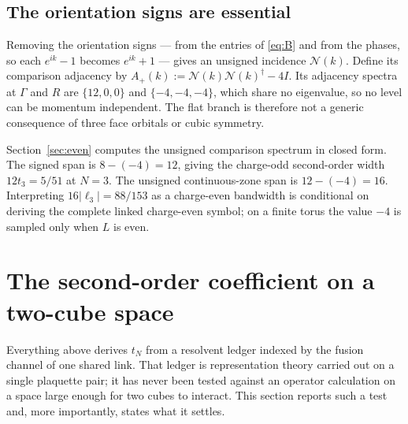 \documentclass[11pt]{article}
\theoremstyle{plain}
\theoremstyle{definition}
\theoremstyle{remark}
\newcommand{\chk}[1]{}
\newcommand{\dg}{^{\dagger}}
\begin{document}
\subsection{The orientation signs are essential}

Removing the orientation signs --- from the entries of \eqref{eq:B} and from
the phases, so each $e^{ik}-1$ becomes $e^{ik}+1$ --- gives an unsigned
incidence $\mathcal N(k)$. Define its comparison adjacency by
$A_+(k):=\mathcal N(k)\mathcal N(k)\dg-4I$.
Its adjacency spectra at $\Gamma$ and $R$ are $\{12,0,0\}$ and $\{-4,-4,-4\}$,
which share no eigenvalue, so no level can be momentum independent. The flat
branch is therefore not a generic consequence of three face orbitals or cubic
symmetry.

Section~\ref{sec:even} computes the unsigned comparison spectrum in closed
form. The signed span is $8-(-4)=12$, giving the charge-odd second-order width
$12t_3=5/51$ at $N=3$. The unsigned continuous-zone span is
$12-(-4)=16$. Interpreting $16|\ell_3|=88/153$ as a charge-even bandwidth is
conditional on deriving the complete linked charge-even symbol; on a finite
torus the value $-4$ is sampled only when $L$ is even.
\chk{the two band spans ARE the two incidence spectra}

\section{The second-order coefficient on a two-cube space}
\label{sec:twocube}

Everything above derives $t_N$ from a resolvent ledger indexed by the fusion
channel of one shared link. That ledger is representation theory carried out on
a single plaquette pair; it has never been tested against an operator
calculation on a space large enough for two cubes to interact. This section
reports such a test and, more importantly, states what it settles.
\end{document}
